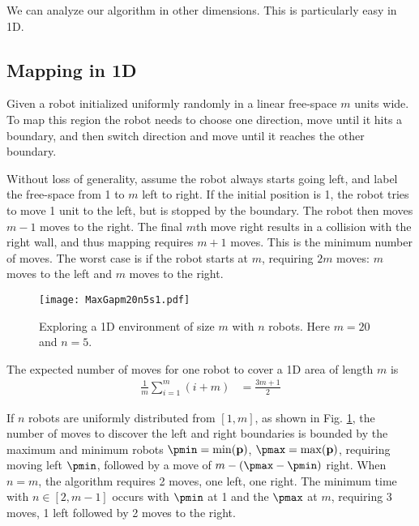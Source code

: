 
We can analyze our algorithm in other dimensions.  This is particularly easy in 1D.
 
\subsection{Mapping in 1D}

Given a robot initialized uniformly randomly in a linear free-space $m$ units wide.  To map this region the robot needs to choose one direction, move until it hits a boundary, and then switch direction and move until it reaches the other boundary.




Without loss of generality, assume the robot always starts going left, and label the free-space from 1 to $m$ left to right.  If the initial position is 1, the robot tries to move 1 unit to the left, but is stopped by the boundary. The robot then moves $m-1$ moves to the right.  The final $m$th move right results in a collision with the right wall, and thus mapping requires $m+1$ moves. This is the minimum number of moves.  The worst case is if the robot starts at $m$, requiring $2m$ moves: $m$ moves to the left and $m$ moves to the right.

\begin{figure}
\begin{center}
	\texttt{[image: MaxGapm20n5s1.pdf]}
\end{center}
\caption{\label{fig:coverage1d}
Exploring a 1D environment of size $m$ with $n$ robots.  Here $m=20$ and $n=5$.
}
\end{figure}


The expected number of moves for one robot to cover a 1D area of length $m$ is 
\begin{align}
\frac{1}{m} \sum _{i=1}^m (i+m) &= \frac{3 m+1}{2}  \label{eq:expectedMoves1robot1D}
\end{align}


If $n$ robots are uniformly distributed from $[1, m]$, as shown in Fig. \ref{fig:coverage1d}, the number of moves to discover the left and right boundaries is bounded by the maximum and minimum robots $ \pmin =\min(\mathbf{p})$, $\pmax =\max(\mathbf{p})$, requiring moving left $\pmin$, followed by a move of $m-(\pmax - \pmin ) $ right.
When $n=m$, the algorithm requires 2 moves, one left, one right.
The minimum time with $n\in[2,m-1]$ occurs with $\pmin$ at 1 and the $\pmax$ at $m$, requiring 3 moves, 1 left followed by 2 moves to the right.  

